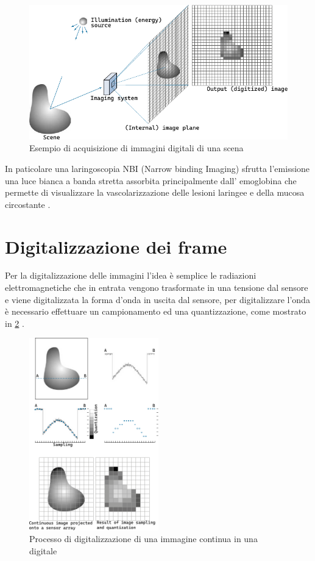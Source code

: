 \begin{figure}[ht]
    \centering
    \includegraphics[width=1\textwidth]{frame/digital_image_acquisition.pdf}
    \caption{Esempio di acquisizione di immagini digitali di una scena}
    \label{fig:scena-acquisizione}
\end{figure}

In paticolare una laringoscopia NBI (Narrow binding Imaging)  sfrutta l’emissione una luce bianca a banda stretta assorbita principalmente dall’ emoglobina che permette  di visualizzare la vascolarizzazione delle lesioni laringee e della mucosa circostante \cite{giorgio_cenni_2008}. 

\section{Digitalizzazione dei frame}\label{digitalizzazione-dei-frame}

Per la digitalizzazione delle immagini l'idea è semplice le radiazioni elettromagnetiche che in entrata vengono trasformate in una tensione dal sensore e viene digitalizzata la forma d'onda in uscita dal sensore, per digitalizzare l'onda è necessario effettuare un campionamento ed una quantizzazione, come mostrato in \cref{fig:campionamento-quantizzazione} \cite{gonzalez_dip}.

\begin{figure}[ht]
    \centering
    \includegraphics[width=0.5\textwidth]{frame/Sampling-Quantization.pdf}
    \caption{Processo di digitalizzazione di una immagine continua in una digitale}
    \label{fig:campionamento-quantizzazione}
\end{figure}

